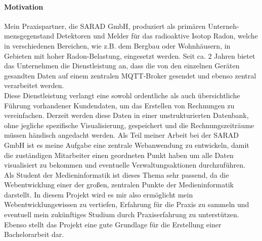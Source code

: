 \documentclass[letterpaper,11pt,leqno]{article}
\begin{document}
\paragraph{Motivation}
Mein Praxispartner, die SARAD GmbH, produziert als primären Unterneh-\\mensgegenstand Detektoren und
Melder für das radioaktive Isotop Radon, welche in verschiedenen Bereichen, wie z.B. dem Bergbau
oder Wohnhäusern, in Gebieten mit hoher Radon-Belastung, eingesetzt werden. Seit ca. 2 Jahren bietet
das Unternehmen die Dienstleistung an, dass die von den einzelnen Geräten gesandten Daten auf einem
zentralen MQTT-Broker gesendet und ebenso zentral verarbeitet werden.\\Diese Dienstleistung verlangt
eine sowohl ordentliche als auch übersichtliche Führung vorhandener Kundendaten, um das Erstellen
von Rechnungen zu vereinfachen. Derzeit werden diese Daten in einer unstrukturierten Datenbank, ohne
jegliche spezifische Visualisierung, gespeichert und die Rechnungszeiträume müssen händisch
angedacht werden. Als Teil meiner Arbeit bei der SARAD GmbH ist es meine Aufgabe eine zentrale
Webanwendung zu entwickeln, damit die zuständigen Mitarbeiter einen geordneten Punkt haben um alle
Daten visualisiert zu bekommen und eventuelle Verwaltungsaktionen durchzuführen.\\Als Student der
Medieninformatik ist dieses Thema sehr passend, da die Webentwicklung einer der großen, zentralen
Punkte der Medieninformatik darstellt. In diesem Projekt wird es mir also ermöglicht mein
Webentwicklungswissen zu vertiefen, Erfahrung für die Praxis zu sammeln und eventuell mein
zukünftiges Studium durch Praxiserfahrung zu unterstützen. Ebenso stellt das Projekt eine gute
Grundlage für die Erstellung einer Bachelorarbeit dar.
\end{document}
